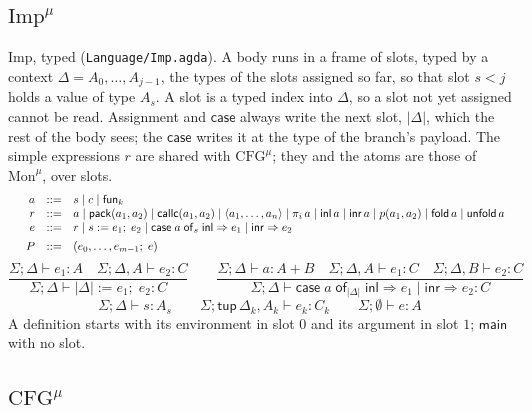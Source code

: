 \documentclass[10pt]{article}
\makeatletter
\theoremstyle{acmplain}
\newcommand{\key}[1]{\mathsf{#1}}
\newcommand{\inl}{\key{inl}\,}
\newcommand{\inr}{\key{inr}\,}
\newcommand{\tuple}[1]{\langle #1 \rangle}
\newcommand{\prj}[1]{\pi_{#1}\,}
\newcommand{\funref}[1]{\key{fun}_{#1}}
\newcommand{\prim}[3]{#1(#2, #3)}
\newcommand{\assign}[3]{#1 \mathrel{:=} #2;\; #3}
\newcommand{\Casei}[4]{\key{case}\;#1\;\key{of}_{#2}\;\key{inl} \Rightarrow #3 \mid \key{inr} \Rightarrow #4}
\newcommand{\Tpack}[2]{\key{pack}(#1, #2)}     %
\newcommand{\Tcallc}[2]{\key{callc}(#1, #2)}   %
\newcommand{\Ml}[1]{\textrm{#1}^{\mu}}                  %
\newcommand{\Mtup}[1]{\key{tup}\,#1}                      %
\newcommand{\Mfold}{\key{fold}\,}
\newcommand{\Munfold}{\key{unfold}\,}
\newenvironment{syntax}{\[\begin{array}{l@{\quad}rcl}}{\end{array}\]}
\makeatother
\begin{document}
\subsection{\texorpdfstring{$\Ml{Imp}$}{Imp-mu}}

Imp, typed (\texttt{Language/Imp.agda}). A body runs in a frame of slots,
typed by a context $\Delta = A_0, \ldots, A_{j-1}$, the types of the slots
assigned so far, so that slot $s < j$ holds a value of type $A_s$. A slot
is a typed index into $\Delta$, so a slot not yet assigned cannot be read.
Assignment and $\key{case}$ always write the next slot, $|\Delta|$, which
the rest of the body sees; the $\key{case}$ writes it at the type of the
branch's payload. The simple expressions $r$ are shared with $\Ml{CFG}$;
they and the atoms are those of $\Ml{Mon}$, over slots.
\begin{syntax}
  & a &::=& s \mid c \mid \funref{k} \\
  & r &::=& a \mid \Tpack{a_1}{a_2} \mid \Tcallc{a_1}{a_2}
    \mid \tuple{a_1,\ldots,a_n} \mid \prj{i} a \mid \inl a \mid \inr a
    \mid \prim{p}{a_1}{a_2} \mid \Mfold a \mid \Munfold a \\
  & e &::=& r \mid \assign{s}{e_1}{e_2} \mid \Casei{a}{s}{e_1}{e_2} \\[1ex]
  & P &::=& (e_0, \ldots, e_{m-1};\; e)
\end{syntax}
\[
  \frac{\Sigma; \Delta \vdash e_1 : A \quad \Sigma; \Delta, A \vdash e_2 : C}
       {\Sigma; \Delta \vdash \assign{|\Delta|}{e_1}{e_2} : C}
  \qquad
  \frac{\Sigma; \Delta \vdash a : A + B \quad
        \Sigma; \Delta, A \vdash e_1 : C \quad \Sigma; \Delta, B \vdash e_2 : C}
       {\Sigma; \Delta \vdash \Casei{a}{|\Delta|}{e_1}{e_2} : C}
\]
\[
  \Sigma; \Delta \vdash s : A_s
  \qquad
  \Sigma; \Mtup{\Delta_k}, A_k \vdash e_k : C_k
  \qquad
  \Sigma; \emptyset \vdash e : A
\]
A definition starts with its environment in slot $0$ and its argument in
slot $1$; $\key{main}$ with no slot.

\subsection{\texorpdfstring{$\Ml{CFG}$}{CFG-mu}}
\end{document}
